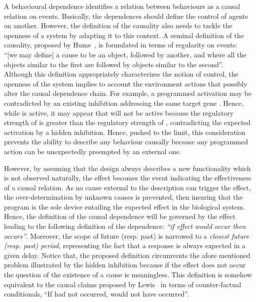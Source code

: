 \documentclass{eptcs}
\newcommand{\ie}[0]{\abbrev{\textit{i.e.}}}
\newcounter{ti}
\begin{document}
 A behavioural dependence identifies a relation between behaviours as a causal relation on events. Basically, the dependences should define the control of agents on another. However, the definition of the causality also needs to tackle the openness of a system by adapting it to this context. A seminal definition of the causality, proposed by Hume~\cite{Hume1739}, is formulated in terms of regularity on events: ``[we may define] a cause to be an object, followed by another, and where all the objects similar to the first are followed by objects similar to the second''. Although this definition appropriately characterizes the notion of control, the openness of the system implies to account the environment actions that possibly alter the causal dependence chain. For example, a programmed activation  may be contradicted by an existing inhibition  addressing the same target gene . Hence, while  is active, it may appear that  will not be active because the regulatory strength of  is greater than the regulatory strength of , contradicting the expected activation by a hidden inhibition. Hence, pushed to the limit, this consideration prevents the ability to describe any behaviour causally because any programmed action can be unexpectedly preempted by an external one. 

However, by assuming that the design always describes a new functionality which is not observed naturally, the effect becomes the event indicating the effectiveness of a causal relation. As no cause external to the description can trigger the effect, the over-determination by unknown causes is prevented, then insuring that the program is the sole device entailing the expected effect in the biological system.
Hence, the definition of the causal dependence will be governed by the effect leading to the following definition of the dependence: \emph{``if effect  would occur then  occurs''}. Moreover, the scope of future (resp. past) is narrowed to a \emph{closest future (resp. past) period}, representing the fact that a response is always expected in a given delay. Notice that, the proposed definition circumvents the afore mentioned problem illustrated by the hidden inhibition because if the effect does not occur the question of the existence of a cause is meaningless. This definition is somehow equivalent to the causal claims proposed by Lewis~\cite{Lewis2000} in terms of counter-factual conditionals, \ie ``If  had not occurred,  would not have occurred''.
 
\end{document}
